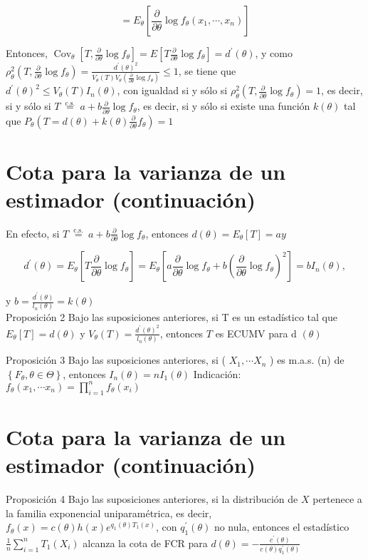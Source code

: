 $$
  =E_{\theta}\left[\frac{\partial}{\partial \theta} \log f_{\theta}\left(x_{1}, \cdots, x_{n}\right)\right]
$$

Entonces, $\operatorname{Cov}_{\theta}\left[T, \frac{\partial}{\partial \theta} \log f_{\theta}\right]=E\left[T \frac{\partial}{\partial \theta} \log f_{\theta}\right]=d^{\prime}(\theta)$, y como $\rho_{\theta}^{2}\left(T, \frac{\partial}{\partial \theta} \log f_{\theta}\right)=\frac{d^{\prime}(\theta)^{2}}{V_{\theta}(T) V_{\theta}\left(\frac{\partial}{\partial \theta} \log f_{\theta}\right)} \leq 1$, se tiene que\\
$d^{\prime}(\theta)^{2} \leq V_{\theta}(T) I_{n}(\theta)$, con igualdad si y sólo si $\rho_{\theta}^{2}\left(T, \frac{\partial}{\partial \theta} \log f_{\theta}\right)=1$, es decir, si y sólo si $T \stackrel{\text { c.s. }}{=} a+b \frac{\partial}{\partial \theta} \log f_{\theta}$, es decir, si y sólo si existe una función $k(\theta)$ tal que $P_{\theta}\left(T=d(\theta)+k(\theta) \frac{\partial}{\partial \theta} f_{\theta}\right)=1$

\section*{Cota para la varianza de un estimador (continuación)}
En efecto, si $T \stackrel{\text { c.s. }}{=} a+b \frac{\partial}{\partial \theta} \log f_{\theta}$, entonces $d(\theta)=E_{\theta}[T]=a y$

$$
  d^{\prime}(\theta)=E_{\theta}\left[T \frac{\partial}{\partial \theta} \log f_{\theta}\right]=E_{\theta}\left[a \frac{\partial}{\partial \theta} \log f_{\theta}+b\left(\frac{\partial}{\partial \theta} \log f_{\theta}\right)^{2}\right]=b I_{n}(\theta),
$$

y $b=\frac{d^{\prime}(\theta)}{l_{n}(\theta)}=k(\theta)$\\
Proposición 2 Bajo las suposiciones anteriores, si T es un estadístico tal que $E_{\theta}[T]=d(\theta)$ y $V_{\theta}(T)=\frac{d^{\prime}(\theta)^{2}}{l_{n}(\theta)}$, entonces $T$ es ECUMV para d $(\theta)$

Proposición 3 Bajo las suposiciones anteriores, si ( $X_{1}, \cdots X_{n}$ ) es m.a.s. (n) de $\left\{F_{\theta}, \theta \in \Theta\right\}$, entonces $I_{n}(\theta)=n I_{1}(\theta)$ Indicación: $f_{\theta}\left(x_{1}, \cdots x_{n}\right)=\prod_{i=1}^{n} f_{\theta}\left(x_{i}\right)$

\section*{Cota para la varianza de un estimador (continuación)}
Proposición 4 Bajo las suposiciones anteriores, si la distribución de $X$ pertenece a la familia exponencial uniparamétrica, es decir, $f_{\theta}(x)=c(\theta) h(x) e^{q_{1}(\theta) T_{1}(x)}$, con $q_{1}^{\prime}(\theta)$ no nula, entonces el estadístico $\frac{1}{n} \sum_{i=1}^{n} T_{1}\left(X_{i}\right)$ alcanza la cota de FCR para $d(\theta)=-\frac{c^{\prime}(\theta)}{c(\theta) q_{1}^{\prime}(\theta)}$

